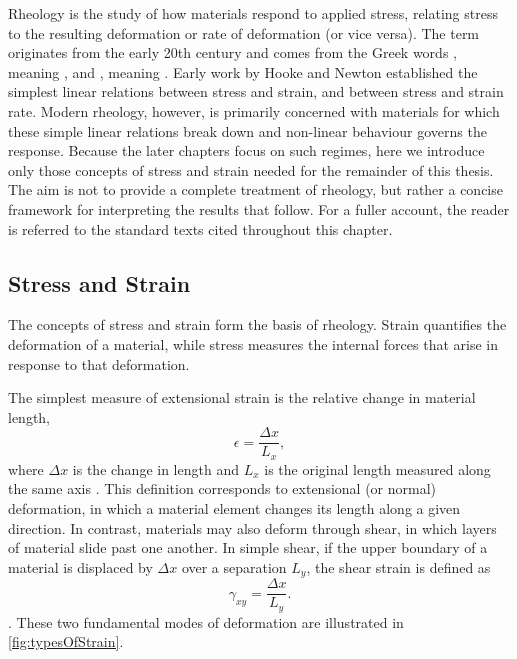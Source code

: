 Rheology is the study of how materials respond to applied stress, relating stress to the resulting deformation or rate of deformation \cite{larson_structure_1999,chenRheologySoftMaterials2010,tannerEngineeringRheology2000,barnes_introduction_1989} (or vice versa). The term originates from the early 20th century and comes from the Greek words , meaning , and , meaning  \cite{barnes_introduction_1989}. Early work by Hooke \cite{hooke_lectures_1678} and Newton \cite{newton_philosophiae_1687} established the simplest linear relations between stress and strain, and between stress and strain rate. Modern rheology, however, is primarily concerned with materials for which these simple linear relations break down and non-linear behaviour governs the response. Because the later chapters focus on such regimes, here we introduce only those concepts of stress and strain needed for the remainder of this thesis. The aim is not to provide a complete treatment of rheology, but rather a concise framework for interpreting the results that follow. For a fuller account, the reader is referred to the standard texts cited throughout this chapter.

\subsection{Stress and Strain} \label{sec:StressAndStrain}

The concepts of stress and strain form the basis of rheology. Strain quantifies the deformation of a material, while stress measures the internal forces that arise in response to that deformation.

The simplest measure of extensional strain is the relative change in material length,
\begin{equation}
    \epsilon = \frac{\Delta x}{L_x},
    \label{eq:simpleStrain}
\end{equation}
where $\Delta x$ is the change in length and $L_x$ is the original length measured along the same axis \cite{lubliner2008plasticity,macoskoRheologyPrinciplesMeasurements1994,barnes_introduction_1989}. This definition corresponds to extensional (or normal) deformation, in which a material element changes its length along a given direction. In contrast, materials may also deform through shear, in which layers of material slide past one another. In simple shear, if the upper boundary of a material is displaced by $\Delta x$ over a separation $L_y$, the shear strain is defined as
\begin{equation}
    \gamma_{xy} = \frac{\Delta x}{L_y}.
\end{equation}
\cite{lubliner2008plasticity,macoskoRheologyPrinciplesMeasurements1994,barnes_introduction_1989}. These two fundamental modes of deformation are illustrated in \cref{fig:typesOfStrain}.

